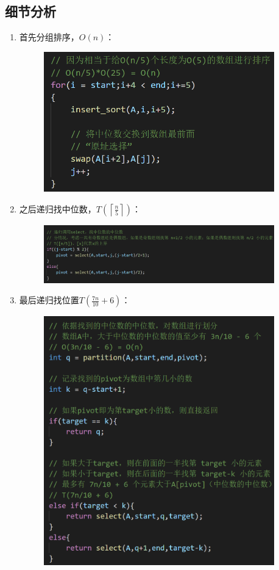 \documentclass{ctexart}[UTF8]
\begin{document}
    \subsection{细节分析}
    \begin{enumerate}
        \item 首先分组排序，$O(n)$：\begin{figure}[H]
            \centering
            \includegraphics[width=10cm]{resources/6_2.png}
        \end{figure}
        \item 之后递归找中位数，$T(\left\lceil \frac{n}{5}\right\rceil)$：\begin{figure}[H]
            \centering
            \includegraphics[width=10cm]{resources/6_3.png}
        \end{figure}
        \item 最后递归找位置$T(\frac{7n}{10} + 6)$：\begin{figure}[H]
            \centering
            \includegraphics[width=10cm]{resources/6_4.png}
        \end{figure}

    \end{enumerate}
\end{document}
